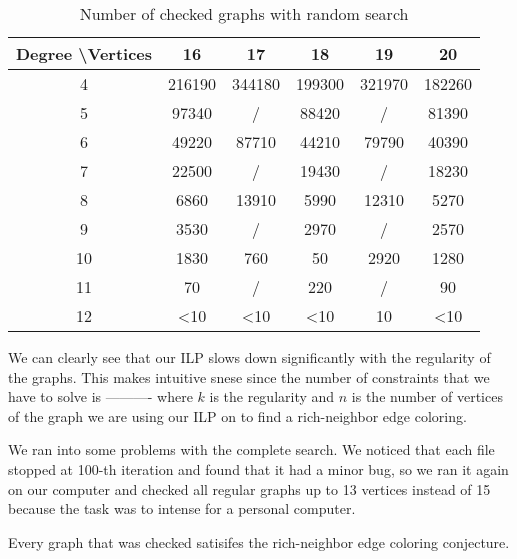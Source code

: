 \documentclass[12pt,a4paper]{amsart}
\theoremstyle{definition} %
\theoremstyle{plain} %
\begin{document}
    \begin{table}[!htbp]
        \begin{tabular}{|c|c|c|c|c|c|}
        \hline
        Degree \textbackslash Vertices & 16            & 17            & 18            & 19     & 20            \\ \hline
        4                              & 216190        & 344180        & 199300        & 321970 & 182260        \\
        5                              & 97340         & /             & 88420         & /      & 81390         \\
        6                              & 49220         & 87710         & 44210         & 79790  & 40390         \\
        7                              & 22500         & /             & 19430         & /      & 18230         \\
        8                              & 6860          & 13910         & 5990          & 12310  & 5270          \\
        9                              & 3530          & /             & 2970          & /      & 2570          \\
        10                             & 1830          & 760           & 50            & 2920   & 1280          \\
        11                             & 70            & /             & 220           & /      & 90            \\
        12                             & \textless{}10 & \textless{}10 & \textless{}10 & 10     & \textless{}10 \\ \hline
        \end{tabular}
        \label{table:2}
        \caption{Number of checked graphs with random search}
    \end{table}
    
    \noindent We can clearly see that our ILP slows down significantly with the regularity of the graphs. This makes intuitive snese since the number of constraints that we have to solve is ---------- where $k$ is the regularity and $n$ is the number of vertices of the graph we are using our ILP on  to find a rich-neighbor edge coloring. 
    
    We ran into some problems with the complete search. We noticed that each file stopped at 100-th iteration and found that it had a minor bug, so we ran it again on our computer and checked all regular graphs up to 13 vertices instead of 15 because the task was to intense for a personal computer.

    \noindent Every graph that was checked satisifes the rich-neighbor edge coloring conjecture.



\end{document}
